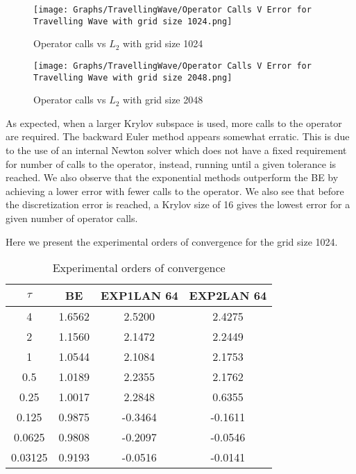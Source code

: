 \begin{figure}[H]
    \centering
    \begin{minipage}{0.49\textwidth}
        \texttt{[image: Graphs/TravellingWave/Operator Calls V Error for Travelling Wave with grid size 1024.png]} %
        \caption{Operator calls vs $L_2$ with grid size 1024}
        \label{fig:plot1}
    \end{minipage}\hfill
    \centering
    \begin{minipage}{0.49\textwidth}
        \texttt{[image: Graphs/TravellingWave/Operator Calls V Error for Travelling Wave with grid size 2048.png]} %
        \caption{Operator calls vs $L_2$ with grid size 2048}
        \label{fig:plot2}
    \end{minipage}\hfill
\end{figure}

As expected, when a larger Krylov subspace is used, more calls to the operator are required.
The backward Euler method appears somewhat erratic.
This is due to the use of an internal Newton solver which does not have a fixed requirement for number of calls to the operator, instead, running until a given tolerance is reached.
We also observe that the exponential methods outperform the BE by achieving a lower error with fewer calls to the operator.
We also see that before the discretization error is reached, a Krylov size of 16 gives the lowest error for a given number of operator calls.

Here we present the experimental orders of convergence for the grid size 1024.

\begin{table}[H]
    \centering
    \begin{tabular}{| c | c | c | c |}
    \hline
    $\tau$ & BE & EXP1LAN 64 & EXP2LAN 64 \\
    \hline
    4 & 1.6562 & 2.5200 & 2.4275 \\
    2 & 1.1560 & 2.1472 & 2.2449 \\
    1 & 1.0544 & 2.1084 & 2.1753 \\
    0.5 & 1.0189 & 2.2355 & 2.1762 \\
    0.25 & 1.0017 & 2.2848 & 0.6355 \\
    0.125 & 0.9875 & -0.3464 & -0.1611 \\
    0.0625 & 0.9808 & -0.2097 & -0.0546 \\
    0.03125 & 0.9193 & -0.0516 & -0.0141 \\
    \hline
    \end{tabular}
    \caption{Experimental orders of convergence}
    \label{tab:EOCs}
\end{table}


